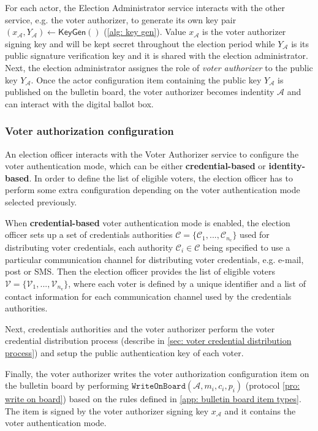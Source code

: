 For each actor, the Election Administrator service interacts with the other service, e.g. the voter authorizer, to generate its own key pair $(x_\mathcal{A}, Y_\mathcal{A}) \gets \mathsf{KeyGen}()$ (\cref{alg: key gen}). Value $x_\mathcal{A}$ is the voter authorizer signing key and will be kept secret throughout the election period while $Y_\mathcal{A}$ is its public signature verification key and it is shared with the election administrator. Next, the election administrator assignes the role of \textit{voter authorizer} to the public key $Y_\mathcal{A}$. Once the actor configuration item containing the public key $Y_\mathcal{A}$ is published on the bulletin board, the voter authorizer becomes indentity $\mathcal{A}$ and can interact with the digital ballot box.


\subsubsection{Voter authorization configuration} \label{sec: voter authorization configuration}
An election officer interacts with the Voter Authorizer service to configure the voter authentication mode, which can be either \textbf{credential-based} or \textbf{identity-based}. In order to define the list of eligible voters, the election officer has to perform some extra configuration depending on the voter authentication mode selected previously.

When \textbf{credential-based} voter authentication mode is enabled, the election officer sets up a set of credentials authorities $\boldsymbol{\mathcal{C}} = \{ \mathcal{C}_1, ..., \mathcal{C}_{n_\mathrm{c}} \}$ used for distributing voter credentials, each authority $\mathcal{C}_i \in \boldsymbol{\mathcal{C}}$ being specified to use a particular communication channel for distributing voter credentials, e.g. e-mail, post or SMS. Then the election officer provides the list of eligible voters $\boldsymbol{\mathcal{V}} = \{ \mathcal{V}_1, ..., \mathcal{V}_{n_\mathrm{v}} \}$, where each voter is defined by a unique identifier and a list of contact information for each communication channel used by the credentials authorities.

Next, credentials authorities and the voter authorizer perform the voter credential distribution process (describe in \cref{sec: voter credential distribution process}) and setup the public authentication key of each voter.

Finally, the voter authorizer writes the voter authorization configuration item on the bulletin board by performing $\mathtt{WriteOnBoard}(\mathcal{A}, m_i, c_i, p_i)$ (protocol \ref{pro: write on board}) based on the rules defined in \cref{app: bulletin board item types}. The item is signed by the voter authorizer signing key $x_\mathcal{A}$ and it contains the voter authentication mode.

